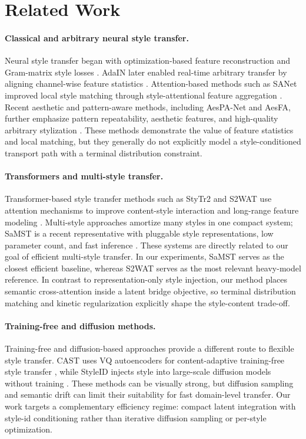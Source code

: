 ﻿\documentclass[letterpaper]{article}
\begin{document}
\section{Related Work}
\paragraph{Classical and arbitrary neural style transfer.}
Neural style transfer began with optimization-based feature reconstruction and Gram-matrix style losses \cite{gatys2016image}. AdaIN later enabled real-time arbitrary transfer by aligning channel-wise feature statistics \cite{huang2017adain}. Attention-based methods such as SANet improved local style matching through style-attentional feature aggregation \cite{park2019sanet}. Recent aesthetic and pattern-aware methods, including AesPA-Net and AesFA, further emphasize pattern repeatability, aesthetic features, and high-quality arbitrary stylization \cite{hong2023aespa,huang2024aesfa}. These methods demonstrate the value of feature statistics and local matching, but they generally do not explicitly model a style-conditioned transport path with a terminal distribution constraint.

\paragraph{Transformers and multi-style transfer.}
Transformer-based style transfer methods such as StyTr2 and S2WAT use attention mechanisms to improve content-style interaction and long-range feature modeling \cite{deng2022stytr2,xia2024s2wat}. Multi-style approaches amortize many styles in one compact system; SaMST is a recent representative with pluggable style representations, low parameter count, and fast inference \cite{liu2024samst}. These systems are directly related to our goal of efficient multi-style transfer. In our experiments, SaMST serves as the closest efficient baseline, whereas S2WAT serves as the most relevant heavy-model reference. In contrast to representation-only style injection, our method places semantic cross-attention inside a latent bridge objective, so terminal distribution matching and kinetic regularization explicitly shape the style-content trade-off.

\paragraph{Training-free and diffusion methods.}
Training-free and diffusion-based approaches provide a different route to flexible style transfer. CAST uses VQ autoencoders for content-adaptive training-free style transfer \cite{gim2024cast}, while StyleID injects style into large-scale diffusion models without training \cite{chung2024styleid}. These methods can be visually strong, but diffusion sampling and semantic drift can limit their suitability for fast domain-level transfer. Our work targets a complementary efficiency regime: compact latent integration with style-id conditioning rather than iterative diffusion sampling or per-style optimization.
\end{document}
